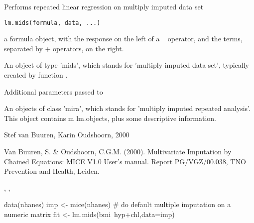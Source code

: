 \begin{Description}\relax
Performs repeated linear regression on multiply imputed data set
\end{Description}
\begin{Usage}
\begin{verbatim}
lm.mids(formula, data, ...)
\end{verbatim}
\end{Usage}
\begin{Arguments}
\begin{ldescription}
\item[\code{formula}] a formula object, with the response on the left of a ~ operator, and the 
terms, separated by + operators, on the right.
\item[\code{data}] An object of type 'mids', which stands for 'multiply imputed data set', typically
created by function .
\item[\code{...}] Additional parameters passed to 
\end{ldescription}
\end{Arguments}
\begin{Value}
An objects of class 'mira', which stands for 'multiply imputed repeated analysis'.
This object contains m lm.objects, plus some descriptive information.
\end{Value}
\begin{Author}\relax
Stef van Buuren, Karin Oudshoorn, 2000
\end{Author}
\begin{References}\relax
Van Buuren, S. \& Oudshoorn, C.G.M. (2000). Multivariate Imputation by Chained Equations: 
MICE V1.0 User's manual. Report PG/VGZ/00.038, TNO Prevention and Health, Leiden.
\end{References}
\begin{SeeAlso}\relax
{}, , 
\end{SeeAlso}
\begin{Examples}
\begin{ExampleCode}
data(nhanes)
imp <- mice(nhanes)     # do default multiple imputation on a numeric matrix
fit <- lm.mids(bmi~hyp+chl,data=imp)
\end{ExampleCode}
\end{Examples}

